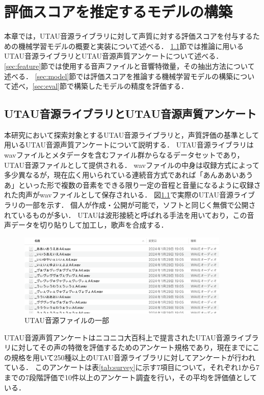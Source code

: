 \chapter{評価スコアを推定するモデルの構築}
\thispagestyle{myheadings}
\label{chap:model}

本章では，UTAU音源ライブラリに対して声質に対する評価スコアを付与するための機械学習モデルの概要と実装について述べる．
\ref{sec:utau}節では推論に用いるUTAU音源ライブラリとUTAU音源声質アンケートについて述べる．
\ref{sec:feature}節では使用する音声ファイルと音響特徴量，その抽出方法について述べる．
\ref{sec:model}節では評価スコアを推論する機械学習モデルの構築について述べ，\ref{sec:eval}節で構築したモデルの精度を評価する．

\section{UTAU音源ライブラリとUTAU音源声質アンケート}
\label{sec:utau}

本研究において探索対象とするUTAU音源ライブラリと，声質評価の基準として用いるUTAU音源声質アンケートについて説明する．
UTAU音源ライブラリはwavファイルとメタデータを含むファイル群からなるデータセットであり，UTAU音源ファイルとして提供される．
wavファイルの中身は収録方式によって多少異なるが，現在広く用いられている連続音方式であれば「あんああいあうあ」\cite{tatsu3shiki}といった形で複数の音素をできる限り一定の音程と音量になるように収録された肉声がwavファイルとして保存されいる．
図\ref{fig:utau_files}で実際のUTAU音源ライブラリの一部を示す．
個人が作成・公開が可能で，ソフトと同じく無償で公開されているものが多い．
UTAUは波形接続と呼ばれる手法を用いており，この音声データを切り貼りして加工し，歌声を合成する．

\begin{figure}[htb]
  \centering
  \includegraphics[width=0.9\textwidth]{fig/utau_files.png}
  \caption{UTAU音源ファイルの一部}
  \label{fig:utau_files}
\end{figure}

UTAU音源声質アンケートはニコニコ大百科上で提言されたUTAU音源ライブラリに対してその声の特徴を評価するためのアンケート規格であり\cite{utausurvey}，現在までにこの規格を用いて250種以上のUTAU音源ライブラリに対してアンケートが行われている．
このアンケートは表\ref{tab:survey}に示す7項目について，それぞれ1から7までの7段階評価で10件以上のアンケート調査を行い，その平均を評価値としている．

